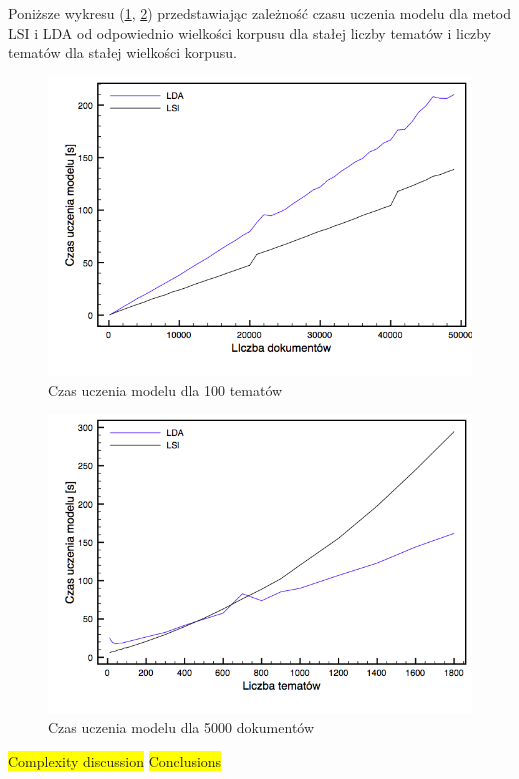 \documentclass[11pt,a4paper]{article}
\newcommand{\todo}[1]{\colorbox{yellow}{#1}}
\begin{document}
Poniższe wykresu (\ref{time-docs}, \ref{time-topics}) przedstawiając zależność
czasu uczenia modelu dla metod LSI i LDA od odpowiednio wielkości korpusu
dla stałej liczby tematów i liczby tematów dla stałej wielkości korpusu.

\begin{figure}[h]
\caption{Czas uczenia modelu dla 100 tematów}
\label{time-docs}
\includegraphics[width=\linewidth]{gfx/time_docs.png}
\end{figure}

\begin{figure}[h]
\caption{Czas uczenia modelu dla 5000 dokumentów}
\label{time-topics}
\includegraphics[width=\linewidth]{gfx/time_topics.png}
\end{figure}

\todo{Complexity discussion}
\todo{Conclusions}
\end{document}

